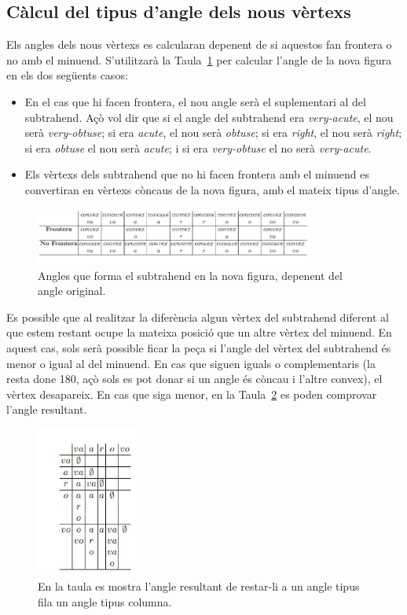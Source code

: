 \documentclass{article}
\begin{document}
\subsection{Càlcul del tipus d'angle dels nous vèrtexs}
Els angles dels nous vèrtexs es calcularan depenent de si aquestos fan frontera o no amb el minuend.
S'utilitzarà la Taula~\ref{fig:taula1} per calcular l'angle de la nova figura en els dos següents casos:

\begin{itemize}
\item En el cas que hi facen frontera, el nou angle serà el suplementari al del subtrahend.
      Açò vol dir que si el angle del subtrahend era \emph{very-acute}, el nou serà \emph{very-obtuse};
      si era \emph{acute}, el nou serà \emph{obtuse};
      si era \emph{right}, el nou serà \emph{right};
      si era \emph{obtuse} el nou serà \emph{acute};
      i si era \emph{very-obtuse} el no serà \emph{very-acute}.

\item Els vèrtexs dels subtrahend que no hi facen frontera amb el minuend es convertiran en vèrtexs còncaus de la nova figura, amb el mateix tipus d'angle.
\end{itemize}

\begin{figure}[h]
\centering
\includegraphics[width=260pt]{images/taula1.jpeg}
\caption {Angles que forma el subtrahend en la nova figura, depenent del angle original.}
\label {fig:taula1}
\end{figure}

Es possible que al realitzar la diferència algun vèrtex del subtrahend diferent al que estem restant ocupe la mateixa posició que un altre vèrtex del minuend.
En aquest cas, sols serà possible ficar la peça si l'angle del vèrtex del subtrahend és menor o igual al del minuend.
En cas que siguen iguals o complementaris (la resta done 180, açò sols es pot donar si un angle és còncau i l'altre convex), el vèrtex desapareix.
En cas que siga menor, en la Taula~\ref{fig:taula2} es poden comprovar l'angle resultant.

\begin{figure}[h]
\centering
\includegraphics[width=100pt]{images/taula2.jpeg}
\caption {En la taula es mostra l'angle resultant de restar-li a un angle tipus fila un angle tipus columna.}
\label {fig:taula2}
\end{figure}
\end{document}
